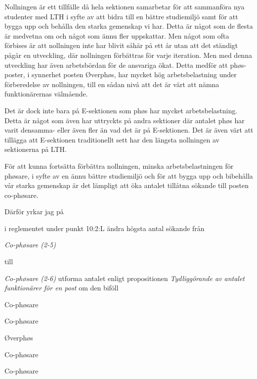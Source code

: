 \documentclass[../_main/handlingar.tex]{subfiles}
\begin{document}

Nollningen är ett tillfälle då hela sektionen samarbetar för att sammanföra nya studenter med LTH i syfte av att bidra till en bättre studiemiljö samt för att bygga upp och behålla den starka gemenskap vi har. Detta är något som de flesta är medvetna om och något som ännu fler uppskattar. Men något som ofta förbises är att nollningen inte har blivit såhär på ett år utan att det ständigt pågår en utveckling, där nollningen förbättras för varje iteration. Men med denna utveckling har även arbetsbördan för de ansvariga ökat. Detta medför att phøs-poster, i synnerhet posten Øverphøs, har mycket hög arbetsbelastning under förberedelse av nollningen, till en sådan nivå att det är värt att nämna funktionärernas välmående.

Det är dock inte bara på E-sektionen som phøs har mycket arbetsbelastning. Detta är något som även har uttryckts på andra sektioner där antalet phøs har varit densamma- eller även fler än vad det är på E-sektionen. Det är även värt att tillägga att E-sektionen traditionellt sett har den längsta nollningen av sektionerna på LTH.

För att kunna fortsätta förbättra nollningen, minska arbetsbelastningen för phøsare, i syfte av en ännu bättre studiemiljö och för att bygga upp och bibehålla vår starka gemenskap är det lämpligt att öka antalet tillåtna sökande till posten co-phøsare.

Därför yrkar jag på
\begin{attsatser}
    \att i reglementet under punkt 10:2:L ändra högsta antal sökande från\par
        \textit{Co-phøsare (2-5)}
    \par
    till\par
        \textit{Co-phøsare (2-6)}
    \att utforma antalet enligt propositionen \textit{Tydliggörande av antalet funktionärer för en post} om den biföll
\end{attsatser}

\begin{signatures}{5}
    \mvh
    \signature{Viktor Persson}{Co-phøsare}
    \signature{Linnea Hellholm}{Co-phøsare}
    \signature{Molly Rusk}{Øverphøs}
    \signature{Elin Branzell}{Co-phøsare}
    \signature{Christian Benson}{Co-phøsare}
\end{signatures}
\end{document}
